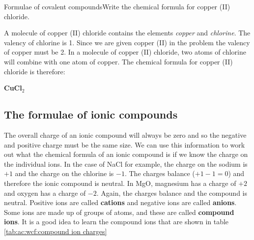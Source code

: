 \begin{wex}{Formulae of covalent compounds}{Write the chemical formula for copper (II) chloride.}{
A molecule of copper (II) chloride contains the elements \textit{copper} and \textit{chlorine}.
The valency of chlorine is 1. Since we are given copper (II) in the problem the valency of copper must be 2. In a molecule of copper (II) chloride, two atoms of chlorine will combine with one atom of copper.
The chemical formula for copper (II) chloride is therefore:

\begin{center}
\textbf{CuCl$_{2}$}
\end{center}}
\end{wex}

\subsection{The formulae of ionic compounds}

The overall charge of an ionic compound will always be zero and so the negative and positive charge must be the same size. We can use this information to work out what the chemical formula of an ionic compound is if we know the charge on the individual ions. In the case of NaCl for example, the charge on the sodium is $+1$ and the charge on the chlorine is $-1$. The charges balance ($+1-1=0$) and therefore the ionic compound is neutral. In MgO, magnesium has a charge of $+2$ and oxygen has a charge of $-2$. Again, the charges balance and the compound is neutral. Positive ions are called \textbf{cations} and negative ions are called \textbf{anions}.\\

Some ions are made up of groups of atoms, and these are called \textbf{compound ions}. It is a good idea to learn the compound ions that are shown in table \ref{tab:ac:wcf:compound ion charges}

